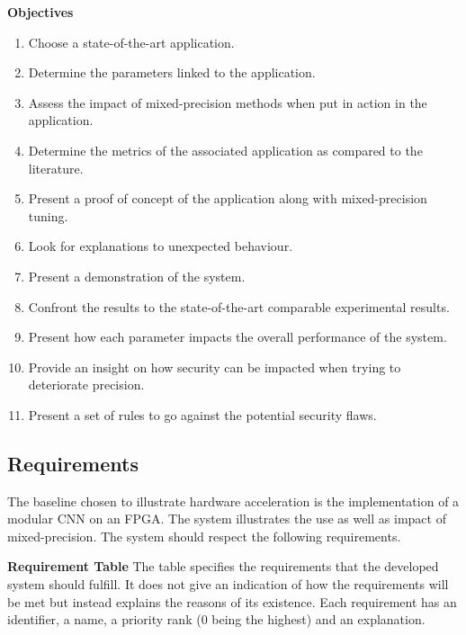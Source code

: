\textbf{Objectives}

\begin{enumerate}
  \item Choose a state-of-the-art application.
  \item Determine the parameters linked to the application.
  \item Assess the impact of mixed-precision methods when put in action in the application.
  \item Determine the metrics of the associated application as compared to the literature.
  \item Present a proof of concept of the application along with mixed-precision tuning.
  \item Look for explanations to unexpected behaviour.
  \item Present a demonstration of the system.
  \item Confront the results to the state-of-the-art comparable experimental results.
  \item Present how each parameter impacts the overall performance of the system.
  \item Provide an insight on how security can be impacted when trying to deteriorate precision.
  \item Present a set of rules to go against the potential security flaws.
\end{enumerate}


\subsection{Requirements}

The baseline chosen to illustrate hardware acceleration is the implementation of a modular CNN on an FPGA. The system illustrates the use as well as impact of mixed-precision. The system should respect the following requirements.

\textbf{Requirement Table} The table specifies the requirements that the developed system should fulfill. It does not give an indication of how the requirements will be met but instead explains the reasons of its existence. Each requirement has an identifier, a name, a priority rank (0 being the highest) and an explanation.


